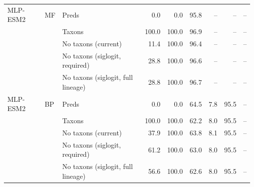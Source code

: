 \begin{tabular}{lllrrrrrr}
\addlinespace
MLP-ESM2 & MF & Preds & 0.0 & 0.0 & 95.8 & -- & -- & -- \\
 &  & Taxons & 100.0 & 100.0 & 96.9 & -- & -- & -- \\
 &  & No taxons (current) & 11.4 & 100.0 & 96.4 & -- & -- & -- \\
 &  & No taxons (siglogit, required) & 28.8 & 100.0 & 96.6 & -- & -- & -- \\
 &  & No taxons (siglogit, full lineage) & 28.8 & 100.0 & 96.7 & -- & -- & -- \\
\addlinespace
MLP-ESM2 & BP & Preds & 0.0 & 0.0 & 64.5 & 7.8 & 95.5 & -- \\
 &  & Taxons & 100.0 & 100.0 & 62.2 & 8.0 & 95.5 & -- \\
 &  & No taxons (current) & 37.9 & 100.0 & 63.8 & 8.1 & 95.5 & -- \\
 &  & No taxons (siglogit, required) & 61.2 & 100.0 & 63.0 & 8.0 & 95.5 & -- \\
 &  & No taxons (siglogit, full lineage) & 56.6 & 100.0 & 62.6 & 8.0 & 95.5 & -- \\
\bottomrule
\end{tabular}

